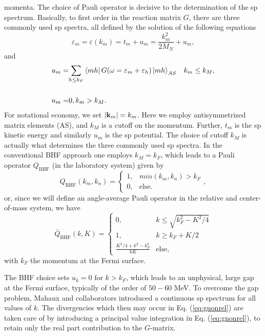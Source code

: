 momenta.
The choice of Pauli operator is decisive to the determination of the
sp
spectrum. Basically, to first order in the reaction matrix $G$,
there are three commonly used sp spectra, all
defined by the solution of the following equations
\begin{equation}
   \varepsilon_{m} = \varepsilon (k_{m})= t_{m} + u_{m}=\frac{k_{m}^2}{2M_N}+u_{m},
   \label{eq:spnrel}
\end{equation}
and
\begin{align}
   u_{m} =& {\displaystyle \sum_{h \leq k_F}}\left\langle m h \right| G(\omega = \varepsilon_{m} + \varepsilon_h )
   \left| m h \right\rangle_{AS}  \hspace{3mm}k_m \leq k_M,  \\ \\
   u_m=&0, k_m > k_M.
   \label{eq:selfcon}
\end{align}
For notational economy, we set $|{\bf k}_m|=k_m$.
Here we employ antisymmetrized matrix elements (AS), and $k_M$ is a cutoff
on the momentum. Further, $t_m$ is the sp kinetic
energy and similarly $u_m$
is the
sp potential.
The choice of cutoff $k_M$ is actually what determines the three
commonly used sp spectra.
In the conventional BHF approach one employs $k_M = k_F$,
which leads
to a Pauli operator $Q_{\mathrm{BHF}}$ (in the laboratory system) given by
\begin{equation}
   Q_{\mathrm{BHF}}(k_m , k_n ) =
    \left\{\begin{array}{cc}1,&min(k_m ,k_n ) > k_F\\
    0,&\mathrm{else}.\end{array}\right.
    \label{eq:bhf},
\end{equation}
or, since we will define an
angle-average Pauli operator in the relative and center-of-mass
system, we have
\begin{equation}
     \bar{Q}_{\mathrm{BHF}}(k,K)=\left\{\begin{array}{cc}
         0,&k\leq \sqrt{k_{F}^{2}-K^2/4}\\
         1,&k\geq k_F + K/2\\
	\frac{K^2/4+k^2 -k_{F}^2}{kK}&\mathrm{else},\end{array}\right.
    \label{eq:qbhf}
\end{equation}
with $k_F$ the momentum at the Fermi surface.

The BHF choice sets $u_k = 0$ for $k > k_F$, which leads
to an unphysical, large gap at the Fermi surface, typically
of the order of $50-60$ MeV. 
To overcome the gap
problem, Mahaux and collaborators 
introduced a continuous sp spectrum
for all values of $k$. The divergencies
which then may occur in Eq. (\ref{eq:gnonrel}) are taken care of by
introducing
a principal value integration in Eq. (\ref{eq:gnonrel}),
to retain only the
real part contribution to the $G$-matrix.


